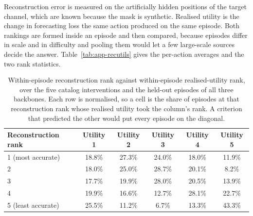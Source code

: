 \documentclass{article}
\begin{document}
Reconstruction error is measured on the artificially hidden positions of the target channel,
which are known because the mask is synthetic. Realised utility is the change in forecasting
loss the same action produced on the same episode. Both rankings are formed inside an episode
and then compared, because episodes differ in scale and in difficulty and pooling them would
let a few large-scale sources decide the answer. Table~\ref{tab:app-recutils} gives the
per-action averages and the two rank statistics.

\begin{table}[h]
  \caption{Within-episode reconstruction rank against within-episode realised-utility rank,
  over the five catalog interventions and the held-out episodes of all three backbones. Each
  row is normalised, so a cell is the share of episodes at that reconstruction rank whose
  realised utility took the column's rank. A criterion that predicted the other would put every
  episode on the diagonal.}
  \label{tab:rankgrid}
  \centering
  \small
  \setlength{\tabcolsep}{4pt}
\begin{tabular}{lccccc}
    \toprule
    Reconstruction rank & Utility 1 & Utility 2 & Utility 3 & Utility 4 & Utility 5 \\
    \midrule
    1 (most accurate) & 18.8\% & 27.3\% & 24.0\% & 18.0\% & 11.9\% \\
    2 & 18.0\% & 25.0\% & 28.7\% & 20.1\% & 8.2\% \\
    3 & 17.7\% & 19.9\% & 28.0\% & 20.5\% & 13.9\% \\
    4 & 19.9\% & 16.6\% & 12.7\% & 28.1\% & 22.7\% \\
    5 (least accurate) & 25.5\% & 11.2\% & 6.7\% & 13.3\% & 43.3\% \\
    \bottomrule
  \end{tabular}
\end{table}
\end{document}
